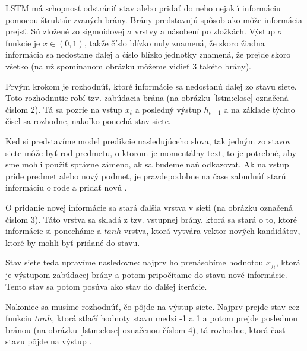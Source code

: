 LSTM má schopnosť odstrániť stav alebo pridať do neho nejakú informáciu pomocou štruktúr zvaných brány. Brány predstavujú spôsob ako môže informácia prejsť. 
Sú zložené zo sigmoidovej $\sigma$ vrstvy a násobení po zložkách. Výstup $\sigma$ funkcie je $x \in (0,1)$, takže číslo blízko nuly znamená, že skoro žiadna informácia sa nedostane ďalej a číslo blízko jednotky znamená, že prejde skoro všetko (na už spomínanom obrázku môžeme vidieť 3 takéto brány).

Prvým krokom je rozhodnúť, ktoré informácie sa nedostanú ďalej zo stavu siete. Toto rozhodnutie robí tzv. zabúdacia brána (na obrázku \ref{lstm:close} označená číslom 2). Tá sa pozrie na vstup $x_t$ a posledný výstup $h_{t-1}$ a na základe týchto čísel sa rozhodne, nakoľko ponechá stav siete.

Keď si predstavíme model predikcie nasledujúceho slova, tak jedným zo stavov siete môže byť rod predmetu, o ktorom je momentálny text, to je potrebné, aby sme mohli použiť správne zámeno, ak sa budeme naň odkazovať. Ak na vstup príde predmet alebo nový podmet, je pravdepodobne na čase zabudnúť starú informáciu o rode a pridať novú \citep{rnn:colah}.

O pridanie novej informácie sa stará ďalšia vrstva v sieti (na obrázku označená číslom 3). Táto vrstva sa skladá z tzv. vstupnej brány, ktorá sa stará o to, ktoré informácie si ponecháme a $tanh$ vrstva, ktorá vytvára vektor nových kandidátov, ktoré by mohli byť pridané do stavu.

Stav siete teda upravíme nasledovne: najprv ho prenásobíme hodnotou $x_{f_t}$, ktorá je výstupom zabúdacej brány a potom pripočítame do stavu nové informácie. Tento stav sa potom posúva ako stav do ďalšej iterácie.

Nakoniec sa musíme rozhodnúť, čo pôjde na výstup siete. Najprv prejde stav cez funkciu $tanh$, ktorá stlačí hodnoty stavu medzi -1 a 1 a potom prejde poslednou bránou (na obrázku \ref{lstm:close} označenou číslom 4), tá rozhodne, ktorá časť stavu pôjde na výstup \citep{rnn:colah}.

